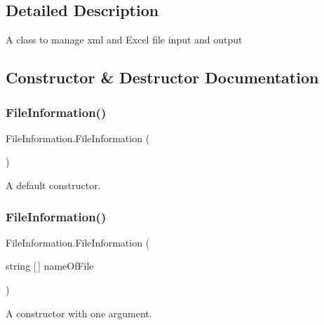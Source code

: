 \subsection{Detailed Description}
A class to manage xml and Excel file input and output 

\subsection{Constructor \& Destructor Documentation}
\mbox{\label{class_file_information_ada73aa01f63bbe5b451f791923e06bcd}} 
\subsubsection{\texorpdfstring{FileInformation()}{FileInformation()}\hspace{0.1cm}{\footnotesize\ttfamily [1/2]}}
{\footnotesize\ttfamily File\+Information.\+File\+Information (\begin{DoxyParamCaption}{ }\end{DoxyParamCaption})\hspace{0.3cm}{\ttfamily [inline]}}



A default constructor. 

\mbox{\label{class_file_information_ae72cab35d7d963bfbe8dafc210ee2988}} 
\subsubsection{\texorpdfstring{FileInformation()}{FileInformation()}\hspace{0.1cm}{\footnotesize\ttfamily [2/2]}}
{\footnotesize\ttfamily File\+Information.\+File\+Information (\begin{DoxyParamCaption}\item[{string \mbox{[}$\,$\mbox{]}}]{name\+Of\+File }\end{DoxyParamCaption})\hspace{0.3cm}{\ttfamily [inline]}}



A constructor with one argument. 


